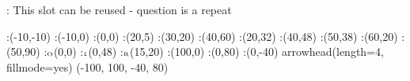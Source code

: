 



\question [TODO]: This slot can be reused - question is a repeat



  \begin{marginfigure}
      :(-10,-10)
      :(-10,0)
      :(0,0)
      :(20,5)
      :(30,20)
      :(40,60)
      :(20,32)
      :(40,48)
      :(50,38)
      :(60,20)
      :(50,90)
      \def\Xmax{100}
      \def\Ymax{80}
      \def\Xmin{-100}
      \def\Ymin{-40}
      :$\tiny\text{O}$(0,0)
      :$\tiny\text{1}$(0,48)
      :$\tiny\text{R}$(15,20)
      :(\Xmax,0)
      :(0,\Ymax)
      :(0,\Ymin)
    \figdrawbegin{}
      \figset arrowhead(length=4, fillmode=yes)
      (\Xmin, \Xmax, \Ymin, \Ymax)
      \figdrawcurve [1,10,50,60,70,80]
      \figdrawcurve [2,10,20,30,40,90]
    \figdrawend
    \centerline{\box\figBoxA}
  \end{marginfigure}

